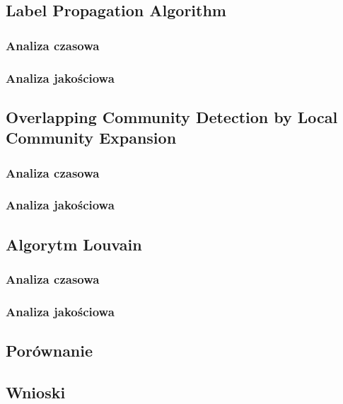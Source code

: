 \documentclass{article}
\begin{document}
\subsection{Label Propagation Algorithm}
\subsubsection{Analiza czasowa}
\subsubsection{Analiza jakościowa}

\subsection{Overlapping Community Detection by Local Community Expansion}
\subsubsection{Analiza czasowa}
\subsubsection{Analiza jakościowa}

\subsection{Algorytm Louvain}
\subsubsection{Analiza czasowa}
\subsubsection{Analiza jakościowa}

\subsection{Porównanie}

\subsection{Wnioski}

\newpage
\printbibliography
\end{document}
